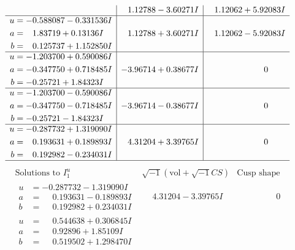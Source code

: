 \documentclass[1p]{elsarticle_modified}
\theoremstyle{definition}
\newcommand{\I}{\sqrt{-1}}
\begin{document}
$$\begin{array}{c|c|c}
 & \phantom{-}1.12788 - 3.60271 I & \phantom{-}1.12062 + 5.92083 I \\ \hline\begin{aligned}
u &= -0.588087 - 0.331536 I \\
a &= \phantom{-}1.83719 + 0.13136 I \\
b &= \phantom{-}0.125737 + 1.152850 I\end{aligned}
 & \phantom{-}1.12788 + 3.60271 I & \phantom{-}1.12062 - 5.92083 I \\ \hline\begin{aligned}
u &= -1.203700 + 0.590086 I \\
a &= -0.347750 + 0.718485 I \\
b &= -0.25721 + 1.84323 I\end{aligned}
 & -3.96714 + 0.38677 I & \phantom{-0.000000 } 0 \\ \hline\begin{aligned}
u &= -1.203700 - 0.590086 I \\
a &= -0.347750 - 0.718485 I \\
b &= -0.25721 - 1.84323 I\end{aligned}
 & -3.96714 - 0.38677 I & \phantom{-0.000000 } 0 \\ \hline\begin{aligned}
u &= -0.287732 + 1.319090 I \\
a &= \phantom{-}0.193631 + 0.189893 I \\
b &= \phantom{-}0.192982 - 0.234031 I\end{aligned}
 & \phantom{-}4.31204 + 3.39765 I & \phantom{-0.000000 } 0\\
 \hline 
 \end{array}$$\newpage$$\begin{array}{c|c|c}  
\text{Solutions to }I^u_{1}& \I (\text{vol} + \sqrt{-1}CS) & \text{Cusp shape}\\
 \hline 
\begin{aligned}
u &= -0.287732 - 1.319090 I \\
a &= \phantom{-}0.193631 - 0.189893 I \\
b &= \phantom{-}0.192982 + 0.234031 I\end{aligned}
 & \phantom{-}4.31204 - 3.39765 I & \phantom{-0.000000 } 0 \\ \hline\begin{aligned}
u &= \phantom{-}0.544638 + 0.306845 I \\
a &= \phantom{-}0.92896 + 1.85109 I \\
b &= \phantom{-}0.519502 + 1.298470 I\end{aligned}

\end{array}$$
\end{document}
